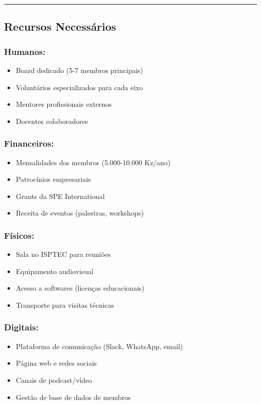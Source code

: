 \documentclass[12pt,a4paper]{article}
\begin{document}
\textcolor{spe-secondary}{\hspace{0.5cm}\rule{0.4\linewidth}{0.8pt}}
\subsection{Recursos Necessários}

\subsubsection*{Humanos:}
\begin{itemize}[itemsep=0.2cm]
    \item Board dedicado (5-7 membros principais)
    \item Voluntários especializados para cada eixo
    \item Mentores profissionais externos
    \item Docentes colaboradores
\end{itemize}

\subsubsection*{Financeiros:}
\begin{itemize}[itemsep=0.2cm]
    \item Mensalidades dos membros (5.000-10.000 Kz/ano)
    \item Patrocínios empresariais
    \item Grants da SPE International
    \item Receita de eventos (palestras, workshops)
\end{itemize}

\subsubsection*{Físicos:}
\begin{itemize}[itemsep=0.2cm]
    \item Sala no ISPTEC para reuniões
    \item Equipamento audiovisual
    \item Acesso a softwares (licenças educacionais)
    \item Transporte para visitas técnicas
\end{itemize}

\subsubsection*{Digitais:}
\begin{itemize}[itemsep=0.2cm]
    \item Plataforma de comunicação (Slack, WhatsApp, email)
    \item Página web e redes sociais
    \item Canais de podcast/vídeo
    \item Gestão de base de dados de membros
\end{itemize}
\end{document}

